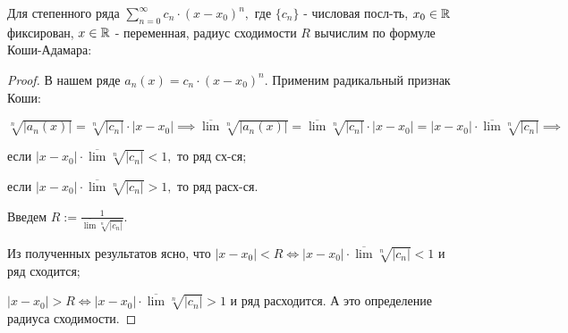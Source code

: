 \documentclass[a4paper, fleqn]{article}
\begin{document}
    Для степенного ряда $\displaystyle \sum_{n = 0}^{\infty} c_n \cdot (x - x_0)^n,$ где $\{ c_n \}$ - числовая посл-ть, $x_0 \in \mathbb{R}$ фиксирован,  $x \in \mathbb{R}$ - переменная, радиус сходимости $R$ вычислим по формуле Коши-Адамара:
    
    
        \begin{proof} 
        В нашем ряде $a_n(x) = c_n \cdot (x - x_0)^n.$ Применим радикальный признак Коши: 
        
        $\sqrt[n]{|a_n(x)|} = \sqrt[n]{|c_n|} \cdot |x - x_0| \implies
        \overline{\lim} \sqrt[n]{|a_n(x)|} = \overline{\lim} \sqrt[n]{|c_n|} \cdot |x - x_0| =
        |x - x_0| \cdot \overline{\lim} \sqrt[n]{|c_n|} \implies $ 
        
        если $|x - x_0| \cdot \overline{\lim} \sqrt[n]{|c_n|} < 1,$ то ряд сх-ся;
        
        если $|x - x_0| \cdot \overline{\lim} \sqrt[n]{|c_n|} > 1,$ то ряд расх-ся.
        
        Введем $R := \frac{1}{\overline{\lim} \sqrt[n]{|c_n|}}.$
        
        Из полученных результатов ясно, что $|x - x_0| < R \iff |x - x_0| \cdot \overline{\lim} \sqrt[n]{|c_n|} < 1$ и ряд сходится; 
        
        $|x - x_0| > R \iff |x - x_0| \cdot \overline{\lim} \sqrt[n]{|c_n|} > 1$ и ряд расходится. А это определение радиуса сходимости.
        
        \end{proof}
        
        
\end{document}
